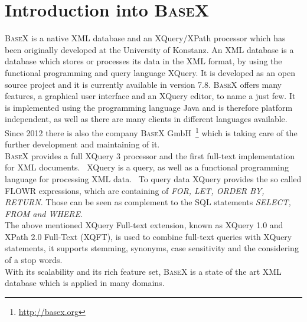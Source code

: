 \section{Introduction into \textsc{BaseX}}
\label{sec:overview:introduction-into-basex}
\textsc{BaseX} is a native XML database and an XQuery/XPath processor which has been originally developed at the University of Konstanz.
An XML database is a database which stores or processes its data in the XML format, by using the functional programming and query language XQuery.
It is developed as an open source project and it is currently available in version 7.8.
\textsc{BaseX} offers many features, a graphical user interface and an XQuery editor, to name a just few.
It is implemented using the programming language Java and is therefore platform independent, as well as there are many clients in different languages available.
Since 2012 there is also the company \textsc{BaseX} GmbH~\footnote{\url{http://basex.org}} which is taking care of the further development and maintaining of it.\\
\textsc{BaseX} provides a full XQuery 3 processor and the first full-text implementation for XML documents.~\cite{grun2009xquery}
XQuery is a query, as well as a functional programming language for processing XML data.~\cite{boag2002xquery} 
To query data XQuery provides the so called FLOWR expressions, which are containing of \textit{FOR, LET, ORDER BY, RETURN}.
Those can be seen as complement to the SQL statements \textit{SELECT, FROM and WHERE}.\\
The above mentioned XQuery Full-text extension, known as XQuery 1.0 and XPath 2.0 Full-Text (XQFT), is used to combine full-text queries with XQuery statements, it supports stemming, synonyms, case sensitivity and the considering of a stop words.~\cite{amer2006xquery}\\
With its scalability and its rich feature set, \textsc{BaseX} is a state of the art XML database which is applied in many domains.
\cite{grun2010storing}

